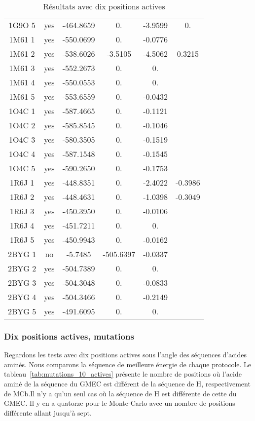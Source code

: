 \begin{table}[h]
{\begin{tabular}{cccccc}
        1G9O 5 & yes & -464.8659 & 0. & -3.9599 & 0.\\
        1M61 1 & yes & -550.0699 & 0. & -0.0776 & \\
        1M61 2 & yes & -538.6026 & -3.5105 & -4.5062 & 0.3215 \\
        1M61 3 & yes & -552.2673 & 0. & 0. & \\
        1M61 4 & yes & -550.0553 & 0. & 0. & \\
        1M61 5 & yes & -553.6559 & 0. & -0.0432 & \\
        1O4C 1 & yes & -587.4665 & 0. & -0.1121 & \\
        1O4C 2 & yes & -585.8545 & 0. & -0.1046 & \\
        1O4C 3 & yes & -580.3505 & 0. & -0.1519 & \\
        1O4C 4 & yes & -587.1548 & 0. & -0.1545 & \\
        1O4C 5 & yes & -590.2650 & 0. & -0.1753 & \\
        1R6J 1 & yes & -448.8351 & 0. & -2.4022 & -0.3986 \\
        1R6J 2 & yes & -448.4631 & 0. & -1.0398 & -0.3049 \\
        1R6J 3 & yes & -450.3950 & 0. & -0.0106 & \\
        1R6J 4 & yes & -451.7211 & 0. & 0. & \\
        1R6J 5 & yes & -450.9943 & 0. & -0.0162 & \\
        2BYG 1 & no  & -5.7485   & -505.6397 & -0.0337 & \\
        2BYG 2 & yes & -504.7389 & 0. & 0. & \\
        2BYG 3 & yes & -504.3048 & 0. & -0.0833 & \\
        2BYG 4 & yes & -504.3466 & 0. & -0.2149 & \\
        2BYG 5 & yes & -491.6095 & 0. & 0. & \\
        
        \bottomrule


 \end{tabular}  
}    
 \caption{Résultats avec dix positions actives }
\label{tab:result_10_actives}
\end{table}

   \subsubsection{Dix positions actives, mutations}

Regardons les tests avec dix positions actives sous l'angle des séquences d'acides aminés. Nous comparons la séquence de meilleure énergie de chaque protocole. Le tableau~\ref{tab:mutations_10_actives} présente le nombre de positions où l'acide aminé de la séquence du GMEC est différent de la séquence de H, respectivement de MCb.Il n'y a qu'un seul cas où  la séquence de H est différente de cette du GMEC.
Il y en a quatorze pour le Monte-Carlo avec un nombre de positions différente allant jusqu'à sept.

